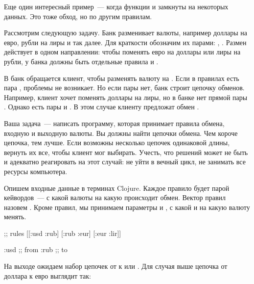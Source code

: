 Еще один интересный пример~--- когда функции  и  замкнуты на
некоторых данных. Это тоже обход, но по другим правилам.


Рассмотрим следующую задачу. Банк разменивает валюты, например доллары на евро,
рубли на лиры и так далее. Для краткости обозначим их парами: ,
. Размен действует в одном направлении: чтобы поменять евро на
доллары или лиры на рубли, у банка должны быть отдельные правила  и
.

В банк обращается клиент, чтобы разменять валюту  на . Если в правилах
есть пара , проблемы не возникает. Но если пары нет, банк строит цепочку
обменов. Например, клиент хочет поменять доллары на лиры, но в банке нет прямой
пары . Однако есть пары  и . В этом случае
клиенту предложат обмен  \arr {} \arr {}.

Ваша задача~--- написать программу, которая принимает правила обмена, входную и
выходную валюты. Вы должны найти цепочки обмена. Чем короче цепочка, тем
лучше. Если возможны несколько цепочек одинаковой длины, вернуть их все, чтобы
клиент мог выбирать. Учесть, что решений может не быть и адекватно реагировать
на этот случай: не уйти в вечный цикл, не занимать все ресурсы компьютера.

Опишем входные данные в терминах Clojure. Каждое правило будет парой
кейвордов~--- с какой валюты на какую происходит обмен. Вектор правил назовем
. Кроме правил, мы принимаем параметры  и , с
какой и на какую валюту менять.

\begin{english}
  \begin{clojure}
;; rules
[[:usd :rub] [:rub :eur] [:eur :lir]]

:usd ;; from
:rub ;; to
  \end{clojure}
\end{english}

На выходе ожидаем набор цепочек от  к  или . Для случая выше
цепочка от доллара к евро выглядит так:

\begin{english}
  \begin{clojure}
  \end{clojure}
\end{english}

